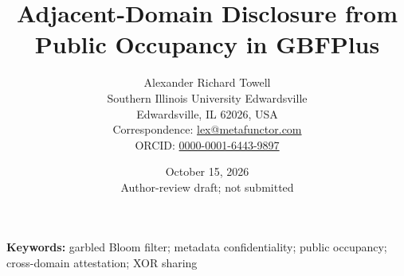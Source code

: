 \documentclass[11pt]{article}
\title{Adjacent-Domain Disclosure from Public Occupancy in GBFPlus}
\author{Alexander Richard Towell\\
\small Southern Illinois University Edwardsville\\
\small Edwardsville, IL 62026, USA\\
\small Correspondence: \href{mailto:lex@metafunctor.com}{lex@metafunctor.com}\\
\small ORCID: \href{https://orcid.org/0000-0001-6443-9897}{0000-0001-6443-9897}}
\date{October 15, 2026\\\small Author-review draft; not submitted}
\begin{document}
\maketitle
\begin{abstract}

\end{abstract}
\noindent\textbf{Keywords:} garbled Bloom filter; metadata confidentiality;
public occupancy; cross-domain attestation; XOR sharing




\end{document}
